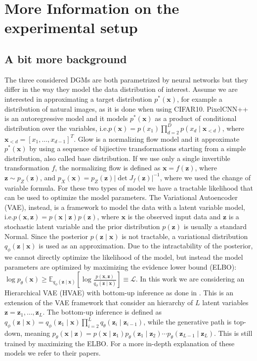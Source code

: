 {\section{More Information on the experimental setup}

\subsection{A bit more background}
The three considered DGMs are both parametrized by neural networks but they differ in the way they model the data distribution of interest. Assume we are interested in approximating a target distribution $p^*(\mathbf{x})$, for example a distribution of natural images, as it is done when using CIFAR10. PixelCNN++ is an autoregressive model and it models $p^*(\mathbf{x})$ as a product of conditional distribution over the variables, i.e.\@ $p(\mathbf{x}) = p(x_1) \prod_{d=2}^D p(x_d \mid \mathbf{x}_{<d})$, where $\mathbf{x}_{<d} = [x_1, \dots, x_{d-1}]^T$. Glow is a normalizing flow model and it approximate $p^*(\mathbf{x})$ by using a sequence of bijiective transformations starting from a simple distribution, also called base distribution. If we use only a single invertible transformation $f$, the normalizing  flow is defined as $\mathbf{x} = f(\mathbf{z})$, where $\mathbf{z} \sim p_{Z}(\mathbf{z})$, and $p_{X}(\mathbf{x}) = p_{Z}(\mathbf{z})|\det J_f(\mathbf{z}) |^{-1}$, where we used the change of variable formula. For these two types of model we have a tractable likelihood that can be used to optimize the model parameters. The Variational Autoencoder (VAE), instead, is a framework to model the data with a latent variable model, i.e.\@ $p(\mathbf{x}, \mathbf{z}) = p(\mathbf{x} \mid \mathbf{z}) p(\mathbf{z})$, where $\mathbf{x}$ is the observed input data and $\mathbf{z}$ is a stochastic latent variable and the prior distribution $p(\mathbf{z})$ is usually a standard Normal. Since the posterior $p(\mathbf{z}\mid\mathbf{x})$ is not tractable, a variational distribution $q_{\phi}(\mathbf{z}\mid\mathbf{x})$ is used as an approximation. Due to the intractability of the posterior, we cannot directly optimize the likelihood of the model, but instead the model parameters are optimized by maximizing the evidence lower bound (ELBO): $\log p_{\theta}(\mathbf{x}) \geq \mathbb{E}_{q_{\phi}(\mathbf{z}\mid \mathbf{x})} \left[ \log \frac{p(\mathbf{x}, \mathbf{z})}{q_{\phi}(\mathbf{z}\mid \mathbf{x})} \right] \equiv \mathcal{L} $. In this work we are considering an Hierarchical VAE (HVAE) with bottom-up inference as done in \cite{havtorn_hierarchical_2021}. This is an extension of the VAE framework that consider an hierarchy of $L$ latent variables $\mathbf{z} = \mathbf{z}_1,\dots, \mathbf{z}_L$. The bottom-up inference is defined as $q_{\phi}(\mathbf{z}\mid \mathbf{x}) = q_{\phi}(\mathbf{z}_1\mid \mathbf{x})\prod_{i=2}^L q_{\theta}(\mathbf{z}_i \mid \mathbf{z}_{i-1})$, while the generative path is top-down, meaning $p_{\theta}(\mathbf{x}\mid \mathbf{z}) = p(\mathbf{x}\mid \mathbf{z}_1)p_{\theta}(\mathbf{z}_1\mid \mathbf{z}_2)\cdots p_{\theta}(\mathbf{z}_{L-1}\mid \mathbf{z}_L)$. This is still trained by maximizing the ELBO. For a more in-depth explanation of these models we refer to their papers.

}
